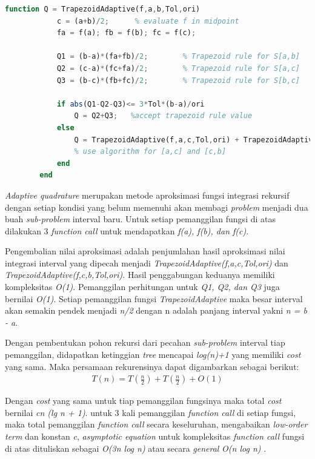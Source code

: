 \documentclass[journal,12pt,onecolumn,a4paper]{IEEEtran}
\begin{document}
\begin{center}
	\begin{lstlisting}[language=Octave]
		function Q = TrapezoidAdaptive(f,a,b,Tol,ori)
			c = (a+b)/2;      % evaluate f in midpoint
			fa = f(a); fb = f(b); fc = f(c);

			Q1 = (b-a)*(fa+fb)/2;        % Trapezoid rule for S[a,b]
			Q2 = (c-a)*(fc+fa)/2;        % Trapezoid rule for S[a,c]
			Q3 = (b-c)*(fb+fc)/2;        % Trapezoid rule for S[b,c]

			if abs(Q1-Q2-Q3)<= 3*Tol*(b-a)/ori
				Q = Q2+Q3;   %accept trapezoid rule value
			else
				Q = TrapezoidAdaptive(f,a,c,Tol,ori) + TrapezoidAdaptive(f,c,b,Tol,ori);
				% use algorithm for [a,c] and [c,b]
			end
		end
	\end{lstlisting}
\end{center}

\emph{Adaptive quadrature} merupakan metode aproksimasi fungsi integrasi rekursif dengan setiap kondisi yang belum memenuhi akan membagi \emph{problem} menjadi dua buah \emph{sub-problem} interval baru. Untuk setiap pemanggilan fungsi di atas dilakukan 3 \emph{function call} untuk mendapatkan \emph{f(a), f(b), dan f(c)}.

Pengembalian nilai aproksimasi adalah penjumlahan hasil aproksimasi nilai integrasi interval yang dipecah menjadi \emph{TrapezoidAdaptive(f,a,c,Tol,ori)} dan \emph{TrapezoidAdaptive(f,c,b,Tol,ori)}. Hasil penggabungan keduanya memiliki kompleksitas \emph{O(1)}. Pemanggilan perhitungan untuk \emph{Q1, Q2, dan Q3} juga bernilai \emph{O(1)}. Setiap pemanggilan fungsi \emph{TrapezoidAdaptive} maka besar interval akan semakin pendek menjadi \emph{n/2} dengan n adalah panjang interval yakni \emph{n = b - a}.

Dengan pembentukan pohon rekursi dari pecahan \emph{sub-problem} interval tiap pemanggilan, didapatkan ketinggian \emph{tree} mencapai \emph{log(n)+1} yang memiliki \emph{cost} yang sama. Maka persamaan rekurensinya dapat digambarkan sebagai berikut:
\begin{equation*}
	\begin{split}
		T(n) = T(\frac{n}{2}) + T(\frac{n}{2}) + O(1)
	\end{split}
\end{equation*}

Dengan \emph{cost} yang sama untuk tiap pemanggilan fungsinya maka total \emph{cost} bernilai \emph{cn (lg n + 1)}. untuk 3 kali pemanggilan \emph{function call} di setiap fungsi, maka total pemanggilan \emph{function call} secara keseluruhan, mengabaikan \emph{low-order term} dan konstan \emph{c}, \emph{asymptotic equation} untuk kompleksitas \emph{function call} fungsi di atas dituliskan sebagai \emph{O(3n log n)} atau secara \emph{general} \emph{O(n log n)} .
\end{document}
